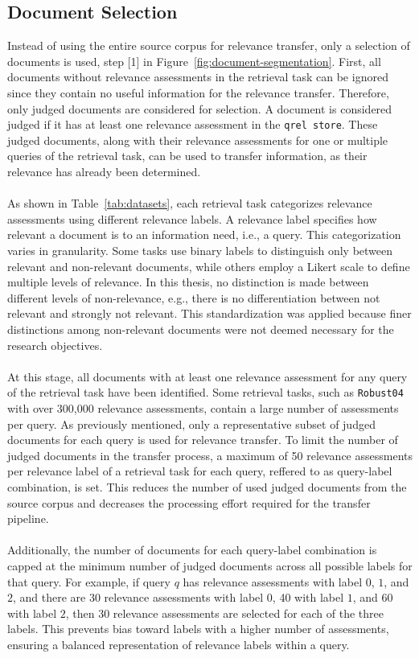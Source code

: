 \subsection{Document Selection}\label{document-selection}

Instead of using the entire source corpus for relevance transfer, only a selection of documents is used, step [1] in Figure~\ref{fig:document-segmentation}. First, all documents without relevance assessments in the retrieval task can be ignored since they contain no useful information for the relevance transfer. Therefore, only judged documents are considered for selection. A document is considered judged if it has at least one relevance assessment in the \texttt{qrel store}. These judged documents, along with their relevance assessments for one or multiple queries of the retrieval task, can be used to transfer information, as their relevance has already been determined.
\\\\
As shown in Table~\ref{tab:datasets}, each retrieval task categorizes relevance assessments using different relevance labels. A relevance label specifies how relevant a document is to an information need, i.e., a query. This categorization varies in granularity. Some tasks use binary labels to distinguish only between relevant and non-relevant documents, while others employ a Likert scale to define multiple levels of relevance. In this thesis, no distinction is made between different levels of non-relevance, e.g., there is no differentiation between \glqq not relevant\grqq{} and \glqq strongly not relevant\grqq{}. This standardization was applied because finer distinctions among non-relevant documents were not deemed necessary for the research objectives.
\\\\
At this stage, all documents with at least one relevance assessment for any query of the retrieval task have been identified. Some retrieval tasks, such as \texttt{Robust04} with over 300,000 relevance assessments, contain a large number of assessments per query. As previously mentioned, only a representative subset of judged documents for each query is used for relevance transfer. To limit the number of judged documents in the transfer process, a maximum of 50 relevance assessments per relevance label of a retrieval task for each query, reffered to as query-label combination, is set. This reduces the number of used judged documents from the source corpus and decreases the processing effort required for the transfer pipeline.
\\\\
Additionally, the number of documents for each query-label combination is capped at the minimum number of judged documents across all possible labels for that query. For example, if query $q$ has relevance assessments with label $0$, $1$, and $2$, and there are 30 relevance assessments with label $0$, 40 with label $1$, and 60 with label $2$, then 30 relevance assessments are selected for each of the three labels. This prevents bias toward labels with a higher number of assessments, ensuring a balanced representation of relevance labels within a query.

